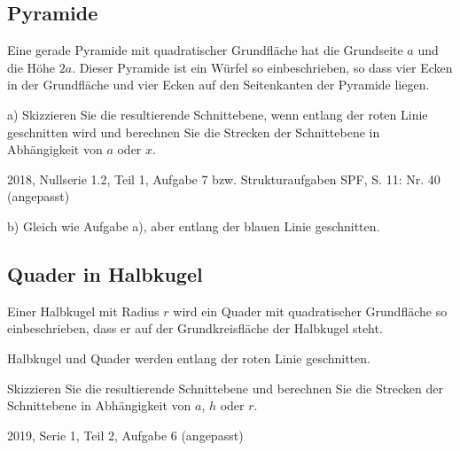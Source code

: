 \subsection{Pyramide}
Eine gerade Pyramide mit quadratischer Grundfläche hat die
Grundseite $a$ und die Höhe $2a$. Dieser Pyramide ist ein Würfel
so einbeschrieben, so dass vier Ecken in der Grundfläche und
vier Ecken auf den Seitenkanten der Pyramide liegen.

a) Skizzieren Sie die resultierende Schnittebene, wenn entlang der
roten Linie geschnitten wird und berechnen Sie die Strecken der
Schnittebene in Abhängigkeit von $a$ oder $x$.

{\tiny{2018, Nullserie 1.2, Teil 1, Aufgabe 7 bzw. Strukturaufgaben SPF, S. 11: Nr. 40 (angepasst)}}


b) Gleich wie Aufgabe a), aber entlang der blauen Linie geschnitten.



\subsection{Quader in Halbkugel}

Einer Halbkugel mit Radius $r$ wird ein Quader mit quadratischer
Grundfläche so einbeschrieben, dass er auf der Grundkreisfläche
der Halbkugel steht.

Halbkugel und Quader werden entlang der roten Linie geschnitten.

Skizzieren Sie die resultierende Schnittebene und berechnen Sie
die Strecken der Schnittebene in Abhängigkeit von $a$, $h$ oder $r$.

{\tiny{2019, Serie 1, Teil 2, Aufgabe 6 (angepasst)}}


